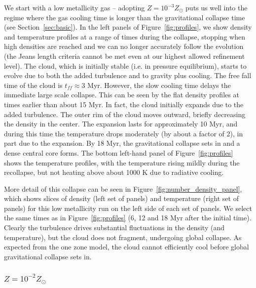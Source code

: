 \documentclass[useAMS,usenatbib]{mn2e}
\begin{document}
We start with a low metallicity gas -- adopting $Z=10^{-3}Z_\odot$ puts us well into the regime
where the gas cooling time is longer than the gravitational collapse time (see Section~\ref{sec:basic}).
In the left panels of Figure~\ref{fig:profiles}, we show density and temperature profiles at a range of times during
the collapse, stopping when high densities are reached and we can no longer accurately follow the evolution
(the Jeans length criteria cannot be met even at our highest allowed refinement level).  
The cloud, which is initially stable (i.e. in pressure equilibrium), starts to evolve due to both the added
turbulence and to gravity plus cooling. The free fall time of the cloud is $t_{ff}\approx 3$ Myr.
However, the slow cooling time delays the immediate large scale collapse.
This can be seen by the flat density profiles at times earlier than about 15 Myr. 
In fact, the cloud initially expands due to the added turbulence. The outer rim
of the cloud moves outward, briefly decreasing the density in the center.
The expansion lasts for approximately 10 Myr, and during this time the temperature drops moderately
(by about a factor of 2), in part due to the expansion.  By 18 Myr, the gravitational
collapse sets in and a dense central core forms.   The bottom left-hand panel of Figure~\ref{fig:profiles}
shows the temperature profiles, with the temperature rising mildly during the recollapse, but
not heating above about 1000 K due to radiative cooling.

More detail of this collapse can be seen in Figure~\ref{fig:number_density_panel}, which shows slices of density (left set of panels) and temperature (right set of panels) for this low metallicity run on the left side of each set of panels.  We select the same times as in Figure~\ref{fig:profiles} (6, 12 and 18 Myr after the initial time).  Clearly the turbulence drives substantial fluctuations in the density (and temperature), but the cloud does not fragment, undergoing global collapse.   As expected from the one zone model, the cloud cannot efficiently cool before global gravitational collapse sets in.


\subsubsection{$Z=10^{-2}Z_\odot$}
\end{document}
